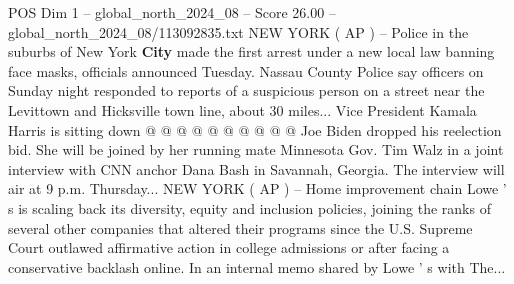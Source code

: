 \begin{textsample}{POS Dim 1 – global\_north\_2024\_08 – Score 26.00 – global\_north\_2024\_08/113092835.txt}
NEW YORK ( AP ) -- Police in the suburbs of New York \textbf{City} made the first arrest under a new local law banning face masks, officials announced Tuesday.
Nassau County Police say officers on Sunday night responded to reports of a suspicious person on a street near the Levittown and Hicksville town line, about 30 miles...
Vice President Kamala Harris is sitting down @ @ @ @ @ @ @ @ @ @ Joe Biden dropped his reelection bid.
She will be joined by her running mate Minnesota Gov.
Tim Walz in a joint interview with CNN anchor Dana Bash in Savannah, Georgia.
The interview will air at 9 p.m.
Thursday...
NEW YORK ( AP ) -- Home improvement chain Lowe ' s is scaling back its diversity, equity and inclusion policies, joining the ranks of several other companies that altered their programs since the U.S.
Supreme Court outlawed affirmative action in college admissions or after facing a conservative backlash online.
In an internal memo shared by Lowe ' s with The...

\end{textsample}

